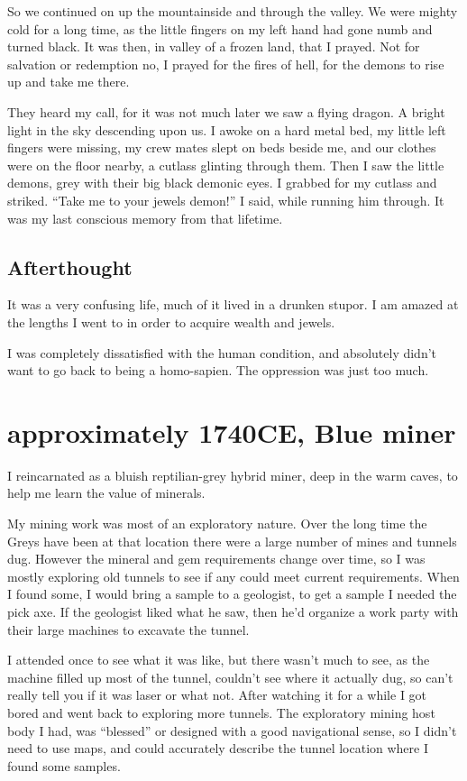 So we continued on up the mountainside and through the valley.  We were mighty cold for a long time, as the little fingers on my left hand had gone numb and turned black.  It was then,  in valley of a frozen land, that I prayed. Not for salvation or redemption no, I prayed for the fires of hell,  for the demons to rise up and take me there.

They heard my call, for it was not much later we saw a flying dragon. A bright
light in the sky descending upon us. I awoke on a hard metal bed, my little left
fingers were missing, my crew mates slept on beds beside me, and our clothes
were on the floor nearby, a cutlass glinting through them. Then I saw the little
demons, grey with their big black demonic eyes.  I grabbed for my cutlass and
striked. “Take me to your jewels demon!” I said, while running him through.  It was my last conscious memory from that lifetime.

\section{Afterthought}
It was a very confusing life, much of it lived in a drunken stupor. 
I am amazed at the lengths I went to in order to acquire wealth and jewels.

I was completely dissatisfied with the human condition, and absolutely didn't
want to go back to being a homo-sapien. The oppression was just too much.


\chapter{approximately 1740CE, Blue miner}\label{greyMiner}
I reincarnated as a bluish reptilian-grey hybrid miner, deep in the warm caves,
to help me learn the value of minerals.

My mining work was most of an exploratory nature. Over the long time the Greys
have been at that location there were a large number of mines and tunnels dug.
However the mineral and gem requirements change over time, so I was mostly
exploring old tunnels to see if any could meet current requirements. When I
found some, I would bring a sample to a geologist, to get a sample I needed the
pick axe. If the geologist liked what he saw, then he'd organize a work party
with their large machines to excavate the tunnel.

I attended once to see what it was like, but there wasn't much to see, as the
machine filled up most of the tunnel, couldn't see where it actually dug, so
can't really tell you if it was laser or what not. After watching it for a while
I got bored and went back to exploring more tunnels. The exploratory mining host
body I had, was ``blessed'' or designed with a good navigational sense, so I
didn't need to use maps, and could accurately describe the tunnel location where
I found some samples.


